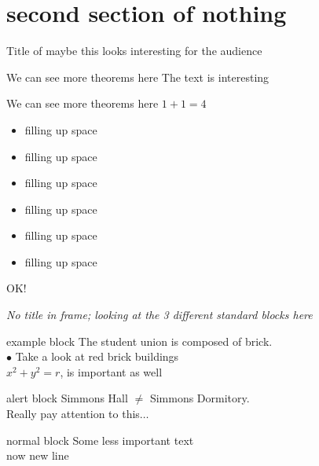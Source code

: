 \documentclass{beamer}
\begin{document}
\section{second section of nothing}
\begin{frame}{Title of maybe this looks interesting for the audience}

  \begin{block}{We can see more theorems here}
    The text is interesting
  \end{block}
  \begin{block}{We can see more theorems here}
    $1+1 = 4$
    \begin{itemize}
    \item filling up space
    \item filling up space
    \item filling up space
    \item filling up space
    \item filling up space
    \item filling up space
    \end{itemize}
    OK!
  \end{block}
  
\end{frame}



\begin{frame}{}

  \emph{{\large No title in frame}; looking at the 3 different standard blocks here}
  
  \begin{exampleblock}{example block}
    The student union is composed of brick.\\
    $\bullet$ Take a look at red brick buildings\\
    $x^2 + y^2 = r$, is important as well
  \end{exampleblock}
  
  \begin{alertblock}{alert block}    
    Simmons Hall $\not=$ Simmons Dormitory.
    \\
    Really pay attention to this$\ldots$
  \end{alertblock}

  \begin{block}{normal block}
    Some less important text\\
    now new line
  \end{block}
  
  
\end{frame}
\end{document}
